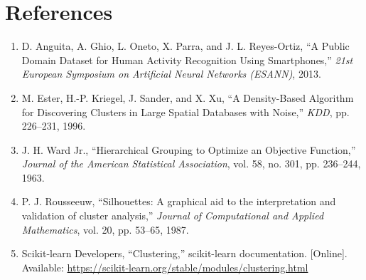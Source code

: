\documentclass[12pt,a4paper]{article}
\DeclareRobustCommand{\_}{\textunderscore\allowbreak}
\begin{document}
\section{References}
\begin{enumerate}[nosep]
\item D. Anguita, A. Ghio, L. Oneto, X. Parra, and J. L. Reyes-Ortiz, ``A
Public Domain Dataset for Human Activity Recognition Using Smartphones,''
\emph{21st European Symposium on Artificial Neural Networks (ESANN)}, 2013.
\item M. Ester, H.-P. Kriegel, J. Sander, and X. Xu, ``A Density-Based
Algorithm for Discovering Clusters in Large Spatial Databases with Noise,''
\emph{KDD}, pp. 226--231, 1996.
\item J. H. Ward Jr., ``Hierarchical Grouping to Optimize an Objective
Function,'' \emph{Journal of the American Statistical Association}, vol. 58,
no. 301, pp. 236--244, 1963.
\item P. J. Rousseeuw, ``Silhouettes: A graphical aid to the interpretation and
validation of cluster analysis,'' \emph{Journal of Computational and Applied
Mathematics}, vol. 20, pp. 53--65, 1987.
\item Scikit-learn Developers, ``Clustering,'' scikit-learn documentation.
[Online]. Available: \url{https://scikit-learn.org/stable/modules/clustering.html}
\end{enumerate}
\end{document}
